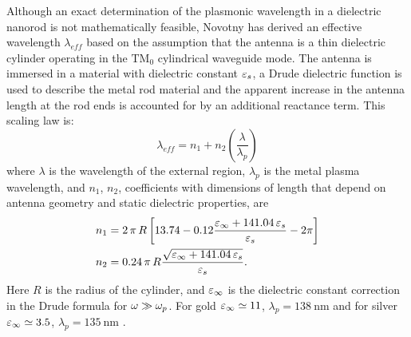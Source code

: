 \documentclass[11pt]{article}
\begin{document}
Although an exact determination of the plasmonic wavelength in a dielectric nanorod is not mathematically feasible, Novotny \cite{Novotny2007} has derived an effective wavelength $\lambda_{eff}$ based on the assumption that the antenna is a thin dielectric cylinder operating in the $\mathrm{TM}_0$ cylindrical waveguide mode. The antenna is immersed in a material with dielectric constant $\varepsilon_s$, a Drude dielectric function is used to describe the metal rod material and the apparent increase in the antenna length at the rod ends is accounted for by an additional reactance term. This scaling law is:
%
\begin{equation}
  \lambda_{eff} = n_1 + n_2\left( \frac{\lambda}{\lambda_p} \right)
  \label{eq:lambda_eff}
\end{equation}
%
where $\lambda$ is the wavelength of the external region, $\lambda_p$ is the metal plasma wavelength, and $n_1$, $n_2$, coefficients with dimensions of length that depend on antenna geometry and static dielectric properties, are
%
\begin{subequations}
  \begin{align}
    n_1 ={}& 2\, \pi\, R \left[ 13.74 - 0.12 \frac{\varepsilon_\infty + 141.04\, \varepsilon_s}{\varepsilon_s} - 2\pi \right]
    \label{eq:n1}\\
    n_2 ={}& 0.24\, \pi\, R \frac{\sqrt{\varepsilon_\infty + 141.04 \, \varepsilon_s}}{\varepsilon_s}.
    \label{eq:n2}
  \end{align}
  \label{eq:ns}
\end{subequations}
%
Here $R$ is the radius of the cylinder, and $\varepsilon_{\infty}$ is the dielectric constant correction in the Drude formula for $\omega \gg \omega_p$. For gold $\varepsilon_\infty \simeq 11$, $\lambda_p = 138~\mathrm{nm}$ and for silver $\varepsilon_\infty \simeq 3.5$,
$\lambda_p = 135~\mathrm{nm}$ \cite{Novotny2007}.
\end{document}
